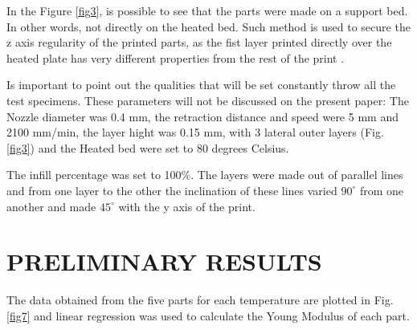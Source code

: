 \documentclass[10pt,fleqn,a4paper,twoside]{article}
\begin{document}
In the Figure \ref{fig3}, is possible to see that the parts were made on a support bed. In other words, not directly on the heated bed. Such method is used to secure the z axis regularity of the printed parts, as the fist layer printed directly over the heated plate has very different properties from the rest of the print \citep{PETG}. 

Is important to point out the qualities that will be set constantly throw all the test specimens. These parameters will not be discussed on the present paper: The Nozzle diameter was 0.4 mm, the retraction distance and speed were 5 mm and 2100 mm/min, the layer hight was 0.15 mm, with 3 lateral outer layers (Fig.\ref{fig3}) and the Heated bed were set to 80 degrees Celsius.

The infill percentage was set to 100\%. The layers were made out of parallel lines and from one layer to the other the inclination of these lines varied $90^\circ$ from one another and made $45^\circ$ with the y axis of the print.









%



\section{PRELIMINARY RESULTS}
The data obtained from the five parts for each temperature are plotted in Fig.\ref{fig7} and linear regression was used to calculate the Young Modulus of each part.
\end{document}
